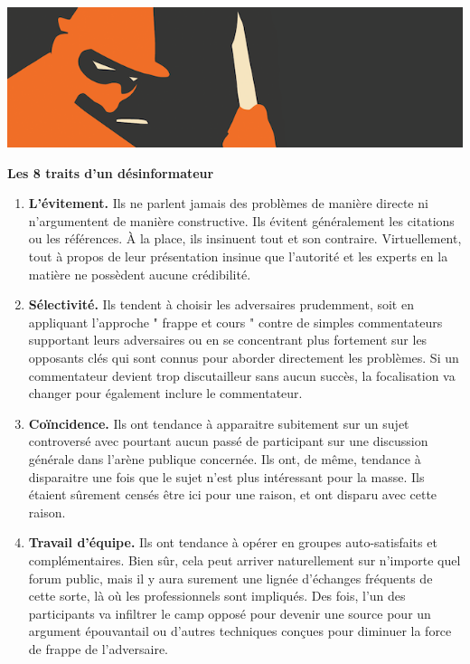 \documentclass[11pt,twoside,a4paper]{article}
\begin{document}
\vfill
\clearpage

\includegraphics[width=\textwidth]{img/wallpaper-295017.png}

\textbf{\Large Les 8 traits d'un d{\'e}sinformateur}~\\
\setlength\parindent{20pt}
\begin{enumerate}
	\item \textbf{L'{\'e}vitement. } Ils ne parlent jamais des probl{\`e}mes de mani{\`e}re directe ni n'argumentent de mani{\`e}re constructive. Ils {\'e}vitent g{\'e}n{\'e}ralement les citations ou les r{\'e}f{\'e}rences. {\`A} la place, ils insinuent tout et son contraire. Virtuellement, tout {\`a} propos de leur pr{\'e}sentation insinue que l'autorit{\'e} et les experts en la mati{\`e}re ne poss{\`e}dent aucune cr{\'e}dibilit{\'e}.
	\item \textbf{S{\'e}lectivit{\'e}. } Ils tendent {\`a} choisir les adversaires prudemment, soit en appliquant l'approche " frappe et cours " contre de simples commentateurs supportant leurs adversaires ou en se concentrant plus fortement sur les opposants cl{\'e}s qui sont connus pour aborder directement les probl{\`e}mes. Si un commentateur devient trop discutailleur sans aucun succ{\`e}s, la focalisation va changer pour {\'e}galement inclure le commentateur.
	\item \textbf{Co{\"i}ncidence. } Ils ont tendance {\`a} apparaitre subitement sur un sujet controvers{\'e} avec pourtant aucun pass{\'e} de participant sur une discussion g{\'e}n{\'e}rale dans l'ar{\`e}ne publique concern{\'e}e. Ils ont, de m{\^e}me, tendance {\`a} disparaitre une fois que le sujet n'est plus int{\'e}ressant pour la masse. Ils {\'e}taient s{\^u}rement cens{\'e}s {\^e}tre ici pour une raison, et ont disparu avec cette raison.
	\item \textbf{Travail d'{\'e}quipe. } Ils ont tendance {\`a} op{\'e}rer en groupes auto-satisfaits et compl{\'e}mentaires. Bien s{\^u}r, cela peut arriver naturellement sur n'importe quel forum public, mais il y aura surement une lign{\'e}e d'{\'e}changes fr{\'e}quents de cette sorte, l{\`a} o{\`u} les professionnels sont impliqu{\'e}s. Des fois, l'un des participants va infiltrer le camp oppos{\'e} pour devenir une source pour un argument {\'e}pouvantail ou d'autres techniques con\c{c}ues pour diminuer la force de frappe de l'adversaire.

\end{enumerate}
\end{document}
